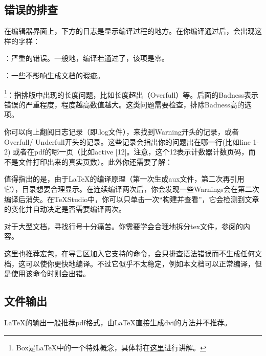 
\subsection{错误的排查}
\label{subsec:debug}
在编辑器界面上，下方的日志是显示编译过程的地方。在你编译通过后，会出现这样的字样：
\begin{feai}
	\item {}：严重的错误。一般地，编译若通过了，该项是零。
	\item {}：一些不影响生成文档的瑕疵。
	\item {\footnote{Box是\LaTeX{}中的一个特殊概念，具体将在\hyperref[sec:box]{这里}进行讲解。}}：指排版中出现的长度问题，比如长度超出（Overfull）等。后面的Badness表示错误的严重程度，程度越高数值越大。这类问题需要检查，排除Badness高的选项。
\end{feai}

你可以向上翻阅日志记录（即.log文件），来找到Warning开头的记录，或者Overfull/ Underfull开头的记录。这些记录会指出你的问题出在哪一行(比如line 1-2) 或者在pdf的哪一页（比如active [12]。注意，这个12表示计数器计数页码，而不是文件打印出来的真实页数）。此外你还需要了解：
\begin{feai}
	\item 值得指出的是，由于\LaTeX{}的编译原理（第一次生成aux文件，第二次再引用它），目录想要合理显示。在连续编译两次后，你会发现一些Warnings会在第二次编译后消失。在\TeX Studio中，你可以只单击一次“构建并查看”，它会检测到文章的变化并自动决定是否需要编译两次。
	\item 对于大型文档，寻找行号十分痛苦。你需要学会合理地拆分tex文件，参阅的内容。
\end{feai}

这里也推荐宏包，在导言区加入它支持的命令，会只排查语法错误而不生成任何文档，这可以使你更快地编译。不过它似乎不太稳定，例如本文档可以正常编译，但是使用该命令时则会出错。

\subsection{文件输出}
\LaTeX{}的输出一般推荐pdf格式，由\LaTeX 直接生成dvi的方法并不推荐。

